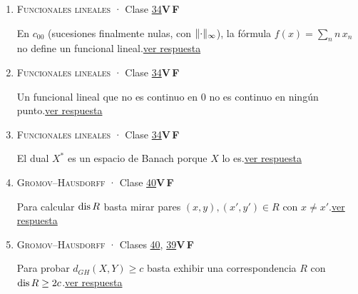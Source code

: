\documentclass[11pt,a4paper]{article}
\begin{document}
\begin{enumerate}[leftmargin=2.2em,itemsep=8pt,label=\textbf{\arabic*.}]
\item[\hyperlink{r-22}{\textbf{22.}}] \hypertarget{q-22}{}{\small \textsc{Funcionales lineales} · Clase \href{https://decostruttivismo.github.io/MAT2514-repaso/pdf/MAT2514_apuntes_completos.pdf\#nameddest=section.34}{34}}\hfill \textbf{V}\,\fbox{\rule{0pt}{6pt}\hspace{6pt}}\quad\textbf{F}\,\fbox{\rule{0pt}{6pt}\hspace{6pt}}\par En $c_{00}$ (sucesiones finalmente nulas, con $\lVert \cdot\rVert_\infty$), la fórmula $f(x)=\sum_nn\,x_n$ no define un funcional lineal.\hfill{\footnotesize\hyperlink{r-22}{ver respuesta}}
\item[\hyperlink{r-23}{\textbf{23.}}] \hypertarget{q-23}{}{\small \textsc{Funcionales lineales} · Clase \href{https://decostruttivismo.github.io/MAT2514-repaso/pdf/MAT2514_apuntes_completos.pdf\#nameddest=section.34}{34}}\hfill \textbf{V}\,\fbox{\rule{0pt}{6pt}\hspace{6pt}}\quad\textbf{F}\,\fbox{\rule{0pt}{6pt}\hspace{6pt}}\par Un funcional lineal que no es continuo en $0$ no es continuo en ningún punto.\hfill{\footnotesize\hyperlink{r-23}{ver respuesta}}
\item[\hyperlink{r-24}{\textbf{24.}}] \hypertarget{q-24}{}{\small \textsc{Funcionales lineales} · Clase \href{https://decostruttivismo.github.io/MAT2514-repaso/pdf/MAT2514_apuntes_completos.pdf\#nameddest=section.34}{34}}\hfill \textbf{V}\,\fbox{\rule{0pt}{6pt}\hspace{6pt}}\quad\textbf{F}\,\fbox{\rule{0pt}{6pt}\hspace{6pt}}\par El dual $X^*$ es un espacio de Banach porque $X$ lo es.\hfill{\footnotesize\hyperlink{r-24}{ver respuesta}}
\item[\hyperlink{r-25}{\textbf{25.}}] \hypertarget{q-25}{}{\small \textsc{Gromov–Hausdorff} · Clase \href{https://decostruttivismo.github.io/MAT2514-repaso/pdf/MAT2514_apuntes_completos.pdf\#nameddest=section.40}{40}}\hfill \textbf{V}\,\fbox{\rule{0pt}{6pt}\hspace{6pt}}\quad\textbf{F}\,\fbox{\rule{0pt}{6pt}\hspace{6pt}}\par Para calcular $\operatorname{dis} R$ basta mirar pares $(x,y),(x',y')\in R$ con $x\ne x'$.\hfill{\footnotesize\hyperlink{r-25}{ver respuesta}}
\item[\hyperlink{r-26}{\textbf{26.}}] \hypertarget{q-26}{}{\small \textsc{Gromov–Hausdorff} · Clases \href{https://decostruttivismo.github.io/MAT2514-repaso/pdf/MAT2514_apuntes_completos.pdf\#nameddest=section.40}{40}, \href{https://decostruttivismo.github.io/MAT2514-repaso/pdf/MAT2514_apuntes_completos.pdf\#nameddest=section.39}{39}}\hfill \textbf{V}\,\fbox{\rule{0pt}{6pt}\hspace{6pt}}\quad\textbf{F}\,\fbox{\rule{0pt}{6pt}\hspace{6pt}}\par Para probar $d_{GH}(X,Y)\ge c$ basta exhibir una correspondencia $R$ con $\operatorname{dis} R\ge2c$.\hfill{\footnotesize\hyperlink{r-26}{ver respuesta}}

\end{enumerate}
\end{document}
